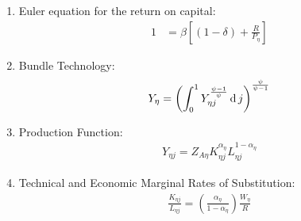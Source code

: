 \documentclass[../thesis.tex]{subfiles}
\begin{document}
\begin{enumerate}
	\item Euler equation for the return on capital:
	\begin{align}
		1 &= \beta \left[ (1 - \delta) + \frac{R}{P_{\eta}} \right] \label{ext-mod:reg-ss-capital-euler-equation}
	\end{align}
	
	\begin{comment}
			\item Region 1 Euler equation for the bonds return:
		\begin{align}
			\frac{\mathbb{E}_{t} \left\{Q_{1} C_{1}^{\sigma} \right\}}{Q_{1} C_{1}^{\sigma}} &= \beta (1 + R_{}) \implies \nonumber \\
			1 &= \beta (1 + R_{}) \label{ext-mod:reg-ss-bonds-euler-equation}
		\end{align}
		
		\item Euler equation for regional consumption:
		\begin{align}
			\frac{\mathbb{E}_{t} \left\{ Q_{1} C_{1}^{\sigma} \right\}}{Q_{1} C_{1}^{\sigma}} &= \frac{\mathbb{E}_{t} \left\{ Q_{2} C_{2}^{\sigma} \right\}}{Q_{2} C_{2}^{\sigma}} = 1 \label{ext-mod:reg-ss-bonds-euler-equation-2}
		\end{align}
	\end{comment}
	
	\item Bundle Technology:
	\begin{align}
		Y_{\eta} = \left( \int_{0}^{1} Y_{\eta j}^{\frac{\psi-1}{\psi}} \operatorname{d} j \right)^{\frac{\psi}{\psi-1}} \label{ext-mod:reg-ss-final-goods-firm-bundle-rule}
	\end{align}

	\item Production Function:
	\begin{align}
		Y_{\eta j} = Z_{A\eta} K_{\eta j}^{\alpha_{\eta}} L_{\eta j}^{1-{\alpha_{\eta}}} 
		\label{ext-mod:reg-ss-int-good-firm-prod-function}
	\end{align}
	
	\item Technical and Economic Marginal Rates of Substitution:
	\begin{align}
		\frac{K_{\eta j}}{L_{\eta j}} = \left( \frac{{\alpha_{\eta}}}{1-\alpha_{\eta}} \right) \frac{W_{\eta}}{R_{}} \label{ext-mod:reg-ss-int-good-firm-TMRS}
	\end{align}
	
	\begin{comment}
		

\end{comment}
\end{enumerate}
\end{document}
